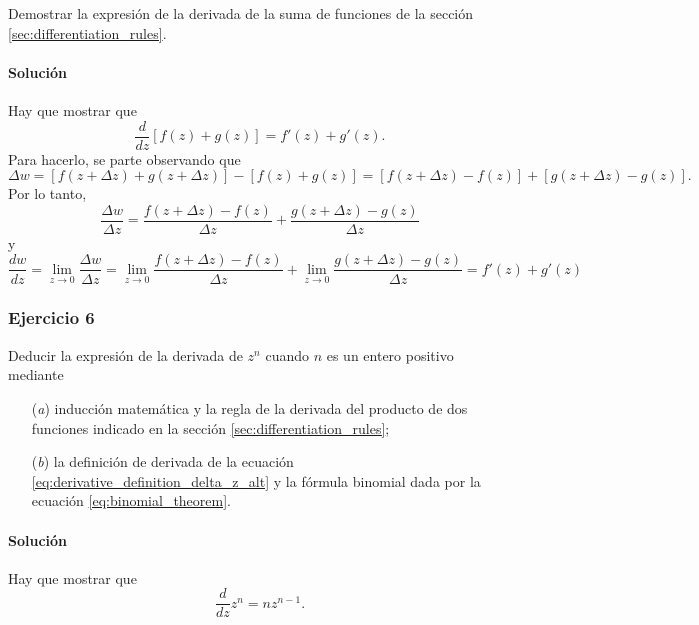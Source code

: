 \documentclass[a4paper]{report}
\begin{document}
Demostrar la expresión de la derivada de la suma de funciones de la sección \ref{sec:differentiation_rules}.

\paragraph{Solución} Hay que mostrar que 
\[
 \frac{d}{dz}[f(z)+g(z)]=f'(z)+g'(z).
\]
Para hacerlo, se parte observando que 
\[
 \Delta w=[f(z+\Delta z)+g(z+\Delta z)]-[f(z)+g(z)]=[f(z+\Delta z)-f(z)]+[g(z+\Delta z)-g(z)].
\]
Por lo tanto,
\[
 \frac{\Delta w}{\Delta z}=\frac{f(z+\Delta z)-f(z)}{\Delta z}+\frac{g(z+\Delta z)-g(z)}{\Delta z}
\]
y
\[
 \frac{dw}{dz}=\lim_{z\to0}\frac{\Delta w}{\Delta z}=\lim_{z\to0}\frac{f(z+\Delta z)-f(z)}{\Delta z}+\lim_{z\to0}\frac{g(z+\Delta z)-g(z)}{\Delta z}=f'(z)+g'(z)
\]

\subsubsection{Ejercicio 6}

Deducir la expresión de la derivada de \(z^n\) cuando \(n\) es un entero positivo mediante
\begin{enumerate}
 \item[(\textit{a})] inducción matemática y la regla de la derivada del producto de dos funciones indicado en la sección \ref{sec:differentiation_rules};
 \item[(\textit{b})] la definición de derivada de la ecuación \ref{eq:derivative_definition_delta_z_alt} y la fórmula binomial dada por la ecuación \ref{eq:binomial_theorem}.
\end{enumerate}

\paragraph{Solución}

Hay que mostrar que 
\[
 \frac{d}{dz}z^n=nz^{n-1}.
\]
\end{document}
